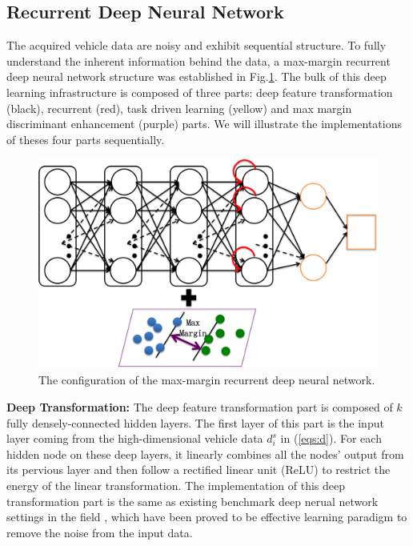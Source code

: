 \documentclass[journal]{IEEEtran}
\begin{document}
\subsection{Recurrent Deep Neural Network}
The acquired vehicle data are noisy and exhibit sequential structure. To fully understand the inherent information behind the data, a max-margin recurrent deep neural network structure was established in Fig.\ref{fig:overview}.  The bulk of this deep learning infrastructure is composed of three parts: deep feature transformation (black),  recurrent (red), task driven learning (yellow) and max margin discriminant enhancement (purple) parts. We will illustrate the implementations of theses four parts sequentially.  
\begin{figure}[!htp]
  \centering
    \includegraphics[width=0.95\linewidth]{overview.png}
  \caption{The configuration of the max-margin recurrent deep neural network. }
\label{fig:overview}
\end{figure}

\textbf{Deep Transformation:} The deep feature transformation part is composed of $k$ fully densely-connected hidden layers. The first layer of this part is the input layer coming from the high-dimensional vehicle data $d^{s}_i$ in (\ref{eqs:d}). For each hidden node on these deep layers, it linearly combines  all the nodes' output from its pervious layer and then follow a rectified linear unit (ReLU) to restrict  the energy of the linear transformation. The implementation of this  deep transformation part is the same as existing benchmark deep nerual network settings in the field \cite{AE}, which have been proved to be effective learning paradigm to remove the noise from the input data.
\end{document}
